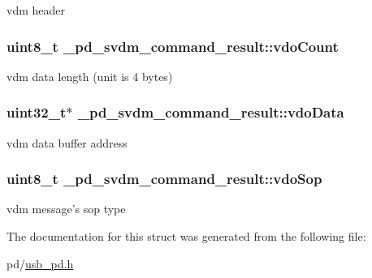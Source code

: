 vdm header \hypertarget{struct__pd__svdm__command__result_a347c19dd5209bb9ef874aa11caf4c07b}{
\subsubsection[{vdo\-Count}]{\setlength{\rightskip}{0pt plus 5cm}uint8\-\_\-t \-\_\-pd\-\_\-svdm\-\_\-command\-\_\-result\-::vdo\-Count}}\label{struct__pd__svdm__command__result_a347c19dd5209bb9ef874aa11caf4c07b}
vdm data length (unit is 4 bytes) \hypertarget{struct__pd__svdm__command__result_acd15ff8f7fe85b7e8ed891199339053f}{
\subsubsection[{vdo\-Data}]{\setlength{\rightskip}{0pt plus 5cm}uint32\-\_\-t$\ast$ \-\_\-pd\-\_\-svdm\-\_\-command\-\_\-result\-::vdo\-Data}}\label{struct__pd__svdm__command__result_acd15ff8f7fe85b7e8ed891199339053f}
vdm data buffer address \hypertarget{struct__pd__svdm__command__result_aa65006c48f37577f5cab247b07bb0cdf}{
\subsubsection[{vdo\-Sop}]{\setlength{\rightskip}{0pt plus 5cm}uint8\-\_\-t \-\_\-pd\-\_\-svdm\-\_\-command\-\_\-result\-::vdo\-Sop}}\label{struct__pd__svdm__command__result_aa65006c48f37577f5cab247b07bb0cdf}
vdm message's sop type 

The documentation for this struct was generated from the following file\-:\begin{DoxyCompactItemize}
\item 
pd/\hyperlink{usb__pd_8h}{usb\-\_\-pd.\-h}\end{DoxyCompactItemize}
